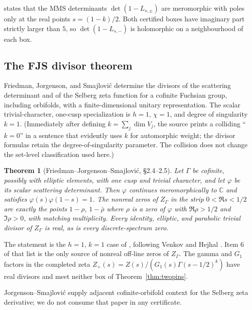 \documentclass[11pt]{amsart}
\newtheorem{theorem}{Theorem}[section]
\theoremstyle{definition}
\theoremstyle{remark}
\begin{document}
\cite[Theorem 4.10]{MMS2012} states that the MMS determinants
$\det(1-L_{s,\pm})$ are meromorphic with poles only at the real points
$s=(1-k)/2$. Both certified boxes have imaginary part strictly larger
than $5$, so $\det(1-L_{s,-})$ is holomorphic on a neighbourhood of
each box.

\subsection{The FJS divisor theorem}
\label{sec:fjs}

Friedman, Jorgenson, and Smajlovi\'c \cite{FJS2021} determine the
divisors of the scattering determinant and of the Selberg zeta
function for a cofinite Fuchsian group, including orbifolds,
with a finite-dimensional unitary representation. The scalar
trivial-character, one-cusp specialization is $h=1$, $\chi=1$, and
degree of singularity $k=1$. (Immediately after defining $k=\sum_j\dim
V_j$, the source prints a colliding ``$k=0$'' in a sentence that
evidently uses $k$ for automorphic weight; the divisor formulas retain
the degree-of-singularity parameter. The collision does not change the
set-level classification used here.)

\begin{theorem}[Friedman--Jorgenson--Smajlovi\'c, \S2.4--2.5]
\label{thm:fjs}
Let $\Gamma$ be cofinite, possibly with elliptic elements, with one
cusp and trivial character, and let $\varphi$ be its scalar scattering
determinant. Then $\varphi$ continues meromorphically to $\mathbb C$
and satisfies $\varphi(s)\varphi(1-s)=1$. The nonreal zeros of
$Z_\Gamma$ in the strip $0<\Re s<1/2$ are exactly the points
$1-\rho$, $1-\bar\rho$ where $\rho$ is a zero of $\varphi$ with
$\Re\rho>1/2$ and $\Im\rho>0$, with matching multiplicity. Every
identity, elliptic, and parabolic trivial divisor of $Z_\Gamma$ is
real, as is every discrete-spectrum zero.
\end{theorem}

The statement is the $h=1$, $k=1$ case of \cite[\S2.5, items
1--7]{FJS2021}, following Venkov \cite{Venkov1990} and Hejhal
\cite[p.~499]{Hejhal1983}. Item 6 of that list is the only source of
nonreal off-line zeros of $Z_\Gamma$. The gamma and $G_1$ factors in
the completed zeta $Z_+(s)=Z(s)/(G_1(s)\Gamma(s-1/2)^k)$ have real
divisors and meet neither box of Theorem~\ref{thm:twopins}.

Jorgenson--Smajlovi\'c \cite{JorgensonSmajlovic2017} supply adjacent
cofinite-orbifold context for the Selberg zeta derivative; we do not
consume that paper in any certificate.
\end{document}
